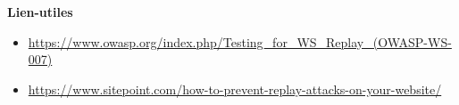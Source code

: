 \bigskip

\begin{flushleft}
\textbf{Lien-utiles}
\end{flushleft}

\begin{itemize}
\item \url{https://www.owasp.org/index.php/Testing_for_WS_Replay_(OWASP-WS-007)}
\item \url{https://www.sitepoint.com/how-to-prevent-replay-attacks-on-your-website/}
\end{itemize}

\endinput

